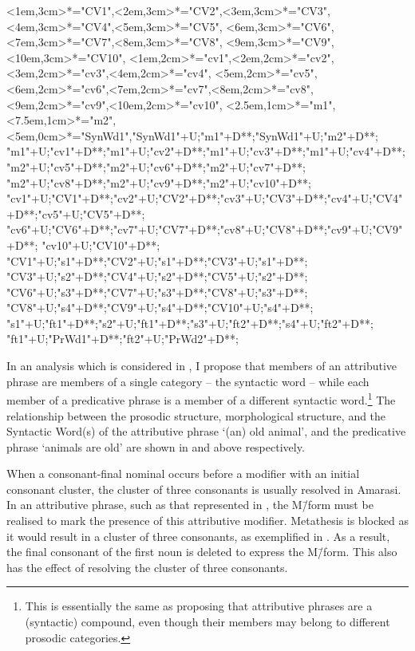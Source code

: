 \begin{multicols}{2}
\begin{exe}
{			<1em,3cm>*="CV1",<2em,3cm>*="CV2",<3em,3cm>*="CV3",
			<4em,3cm>*="CV4",<5em,3cm>*="CV5",
			<6em,3cm>*="CV6",<7em,3cm>*="CV7",<8em,3cm>*="CV8",
			<9em,3cm>*="CV9",<10em,3cm>*="CV10",
			<1em,2cm>*="cv1",<2em,2cm>*="cv2",<3em,2cm>*="cv3",<4em,2cm>*="cv4",
			<5em,2cm>*="cv5",<6em,2cm>*="cv6",<7em,2cm>*="cv7",<8em,2cm>*="cv8",
			<9em,2cm>*="cv9",<10em,2cm>*="cv10",
			<2.5em,1cm>*="m1",<7.5em,1cm>*="m2",
			<5em,0cm>*="SynWd1","SynWd1"+U;"m1"+D**\dir{-};"SynWd1"+U;"m2"+D**\dir{-};
			"m1"+U;"cv1"+D**\dir{-};"m1"+U;"cv2"+D**\dir{-};"m1"+U;"cv3"+D**\dir{-};"m1"+U;"cv4"+D**\dir{-};
			"m2"+U;"cv5"+D**\dir{-};"m2"+U;"cv6"+D**\dir{-};"m2"+U;"cv7"+D**\dir{-};
			"m2"+U;"cv8"+D**\dir{-};"m2"+U;"cv9"+D**\dir{-};"m2"+U;"cv10"+D**\dir{-};
			"cv1"+U;"CV1"+D**\dir{-};"cv2"+U;"CV2"+D**\dir{-};"cv3"+U;"CV3"+D**\dir{-};"cv4"+U;"CV4"+D**\dir{-};"cv5"+U;"CV5"+D**\dir{-};
			"cv6"+U;"CV6"+D**\dir{-};"cv7"+U;"CV7"+D**\dir{-};"cv8"+U;"CV8"+D**\dir{-};"cv9"+U;"CV9"+D**\dir{-};
			"cv10"+U;"CV10"+D**\dir{-};
			"CV1"+U;"s1"+D**\dir{-};"CV2"+U;"s1"+D**\dir{-};"CV3"+U;"s1"+D**\dir{-};
			"CV3"+U;"s2"+D**\dir{-};"CV4"+U;"s2"+D**\dir{-};"CV5"+U;"s2"+D**\dir{-};
			"CV6"+U;"s3"+D**\dir{-};"CV7"+U;"s3"+D**\dir{-};"CV8"+U;"s3"+D**\dir{-};
			"CV8"+U;"s4"+D**\dir{-};"CV9"+U;"s4"+D**\dir{-};"CV10"+U;"s4"+D**\dir{-};
			"s1"+U;"ft1"+D**\dir{-};"s2"+U;"ft1"+D**\dir{-};"s3"+U;"ft2"+D**\dir{-};"s4"+U;"ft2"+D**\dir{-};
			"ft1"+U;"PrWd1"+D**\dir{-};"ft2"+U;"PrWd2"+D**\dir{-};
		\endxy}
	\end{exe}
\end{multicols}

In an analysis which is considered in ,
I propose that members of an attributive phrase
are members of a single category -- the syntactic word --
while each member of a predicative phrase
is a member of a different syntactic word.\footnote{
	This is essentially the same as proposing that
	attributive phrases are a (syntactic) compound,
	even though their members may belong to different
	prosodic categories.}
The relationship between the prosodic structure, morphological structure,
and the Syntactic Word(s) of the attributive phrase
 `(an) old animal',
and the predicative phrase  `animals are old'
are shown in  and  above respectively.

When a consonant-final nominal occurs before a 
modifier with an initial consonant cluster,
the cluster of three consonants is usually resolved in Amarasi.
In an attributive phrase, such as that
represented in ,
the M\=/form must be realised to mark the presence of this attributive modifier.
Metathesis is blocked as it would result in a cluster of three consonants,
as exemplified in .
As a result, the final consonant of the first
noun is deleted to express the M\=/form.
This also has the effect of resolving the cluster of three consonants.

